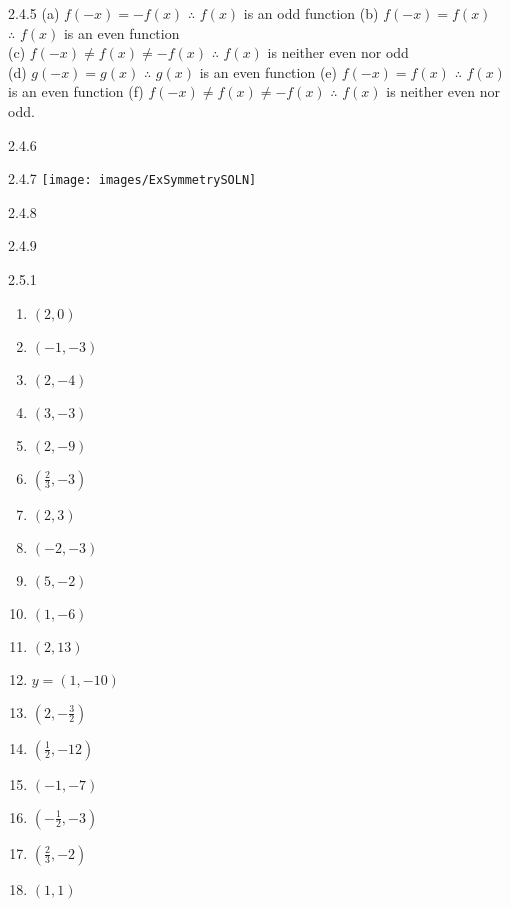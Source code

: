 \begin{Answer}{2.4.5}
				(a) $f(-x)=-f(x)$ $\therefore \,\, f(x)$ is an odd function \hspace{3mm} (b)  $f(-x)=f(x)$ $\therefore \,\, f(x)$ is an even function \\
				(c)  $f(-x)\neq f(x) \neq -f(x)$ $\therefore \,\, f(x)$ is neither even nor odd \\
				(d)  $g(-x)=g(x)$ $\therefore \,\, g(x)$ is an even function \hspace{3mm} (e)  $f(-x)=f(x)$ $\therefore \,\, f(x)$ is an even function \hspace{3mm}  (f) $f(-x) \neq f(x) \neq -f(x)$ $\therefore \,\, f(x)$ is neither even nor odd.
			
\end{Answer}
\begin{Answer}{2.4.6}
		
\end{Answer}
\begin{Answer}{2.4.7}
				\texttt{[image: images/ExSymmetrySOLN]}
			
\end{Answer}
\begin{Answer}{2.4.8}

			
\end{Answer}
\begin{Answer}{2.4.9}

				
\end{Answer}
\begin{Answer}{2.5.1}
	\begin{multicols}{3}
		\begin{enumerate}

			\item $(2,0)$
			\item $(-1,-3)$
			\item $(2,-4)$

			\item $(3,-3)$
			\item $(2,-9)$
			\item $\left(\frac{2}{3}, -3\right)$

			\item $(2,3)$
			\item $(-2,-3)$
			\item $(5,-2)$

			\item $(1,-6)$
			\item $(2,13)$
			\item $y = (1,-10)$

			\item $\left(2, -\frac{3}{2}\right)$
			\item $\left(\frac{1}{2}, -12 \right)$
			\item $(-1,-7)$

			\item $\left(-\frac{1}{2}, -3\right)$
			\item $\left(\frac{2}{3}, -2 \right)$
			\item $(1,1)$
\end{enumerate}
\end{multicols}
\end{Answer}
